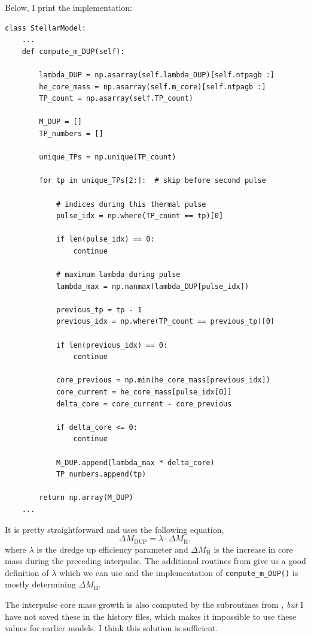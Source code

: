 \documentclass[a4paper,10pt]{article}
\begin{document}
Below, I print the implementation:
\begin{verbatim}
class StellarModel:
    ...
    def compute_m_DUP(self):

        lambda_DUP = np.asarray(self.lambda_DUP)[self.ntpagb :]
        he_core_mass = np.asarray(self.m_core)[self.ntpagb :]
        TP_count = np.asarray(self.TP_count)

        M_DUP = []
        TP_numbers = []

        unique_TPs = np.unique(TP_count)

        for tp in unique_TPs[2:]:  # skip before second pulse

            # indices during this thermal pulse
            pulse_idx = np.where(TP_count == tp)[0]

            if len(pulse_idx) == 0:
                continue

            # maximum lambda during pulse
            lambda_max = np.nanmax(lambda_DUP[pulse_idx])

            previous_tp = tp - 1
            previous_idx = np.where(TP_count == previous_tp)[0]

            if len(previous_idx) == 0:
                continue

            core_previous = np.min(he_core_mass[previous_idx])
            core_current = he_core_mass[pulse_idx[0]]
            delta_core = core_current - core_previous

            if delta_core <= 0:
                continue

            M_DUP.append(lambda_max * delta_core)
            TP_numbers.append(tp)

        return np.array(M_DUP)
    ...
\end{verbatim}
It is pretty straightforward and uses the following equation,
\begin{equation*}
    \Delta M_\text{DUP} = \lambda \cdot \Delta M_\text{H},
\end{equation*}
where \(\lambda \) is the dredge up efficiency parameter and \(\Delta M_\text{H}\) is the increase in core mass during the preceding interpulse. The additional routines from \citet{rees2024b} give us a good definition of \(\lambda\) which we can use and the implementation of \lstinline[style=output, breaklines=true]|compute_m_DUP()| is mostly determining \(\Delta M_\text{H}\).

The interpulse core mass growth is also computed by the subroutines from \citet{rees2024b}, \emph{but} I have not saved these in the history files, which makes it impossible to use these values for earlier models. I think this solution is sufficient.
\end{document}
